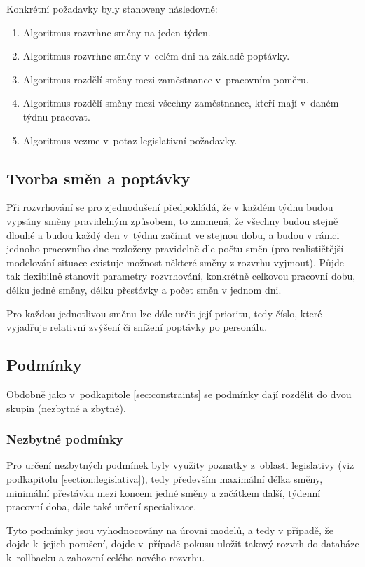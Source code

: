 \documentclass[twoside]{ctuthesis}
\begin{document}
\begin{enumerate}[label=\textbf{O\arabic*.}]
Konkrétní požadavky byly stanoveny následovně:
\begin{enumerate}
	\item Algoritmus rozvrhne směny na jeden týden.
	\item Algoritmus rozvrhne směny v~celém dni na základě poptávky.
	\item Algoritmus rozdělí směny mezi zaměstnance v~pracovním poměru.
	\item Algoritmus rozdělí směny mezi všechny zaměstnance, kteří mají v~daném týdnu pracovat.
	\item Algoritmus vezme v~potaz legislativní požadavky.
\end{enumerate}

\subsection{Tvorba směn a poptávky}\label{sub:demand}
Při rozvrhování se pro zjednodušení předpokládá, že v každém týdnu budou vypsány směny pravidelným způsobem, to znamená, že všechny budou stejně dlouhé a budou každý den v~týdnu začínat ve stejnou dobu, a budou v rámci jednoho pracovního dne rozloženy pravidelně dle počtu směn (pro realističtější modelování situace existuje možnost některé směny z rozvrhu vyjmout). Půjde tak flexibilně stanovit parametry rozvrhování, konkrétně celkovou pracovní dobu, délku jedné směny, délku přestávky a počet směn v jednom dni. 

Pro každou jednotlivou směnu lze dále určit její prioritu, tedy číslo, které vyjadřuje relativní zvýšení či snížení poptávky po personálu.

\subsection{Podmínky}
Obdobně jako v~podkapitole \ref{sec:constraints} se podmínky dají rozdělit do dvou skupin (nezbytné a zbytné).

\subsubsection{Nezbytné podmínky}
Pro určení nezbytných podmínek byly využity poznatky z~oblasti legislativy (viz podkapitolu \ref{section:legislativa}), tedy především maximální délka směny, minimální přestávka mezi koncem jedné směny a začátkem další, týdenní pracovní doba, dále také určení specializace.

Tyto podmínky jsou vyhodnocovány na úrovni modelů, a tedy v případě, že dojde k~jejich porušení, dojde v~případě pokusu uložit takový rozvrh do databáze k~rollbacku a zahození celého nového rozvrhu.


\end{enumerate}
\end{document}
